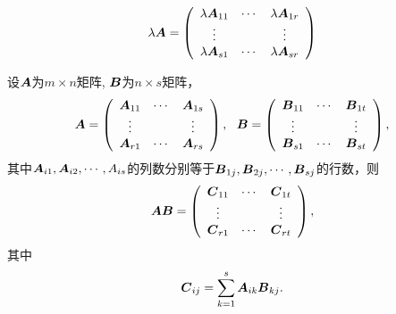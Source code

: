\begin{frame}

  \begin{dingyi}[分块矩阵的数乘]
    $$
    \lambda \boldsymbol{A} = \left(
      \begin{array}{ccc}
        \lambda \boldsymbol{A}_{11} & \cdots & \lambda \boldsymbol{A}_{1r} \\
        \vdots   &     & \vdots   \\
        \lambda \boldsymbol{A}_{s1} & \cdots & \lambda \boldsymbol{A}_{sr}
      \end{array}
    \right)
    $$    
  \end{dingyi}
\end{frame}

\begin{frame}

  \begin{dingyi}[分块矩阵的乘法]
    设$\boldsymbol{A}$为$m\times n$矩阵, $\boldsymbol{B}$为$n \times s$矩阵，
    $$
    \MA = \left(
      \begin{array}{ccc}
        \MA_{11} & \cd & \MA_{1s} \\
        \vd   &     & \vd   \\
        \MA_{r1} & \cd & \MA_{rs}
      \end{array}
    \right), \ \ 
    \MB = \left(
      \begin{array}{ccc}
        \MB_{11} & \cd & \MB_{1t} \\
        \vd   &     & \vd   \\
        \MB_{s1} & \cd & \MB_{st}
      \end{array}
    \right),
    $$
    其中\textcolor{acolor3}{$\boldsymbol{A}_{i1}, \boldsymbol{A}_{i2}, \cdots, A_{is}$的列数分别等于$\boldsymbol{B}_{1j}, \boldsymbol{B}_{2j}, \cdots, \boldsymbol{B}_{sj}$的行数}，则
    $$
    \boldsymbol{A} \boldsymbol{B} = \left(
      \begin{array}{ccc}
        \boldsymbol{C}_{11}   & \cdots & \boldsymbol{C}_{1t}  \\
        \vdots   &     & \vdots   \\
        \boldsymbol{C}_{r1}   & \cdots & \boldsymbol{C}_{rt}
      \end{array}
    \right),
    $$
    其中
    $$
    \boldsymbol{C}_{ij} = \sum_{k=1}^s \boldsymbol{A}_{ik} \boldsymbol{B}_{kj}.
    $$
  \end{dingyi}
\end{frame}

